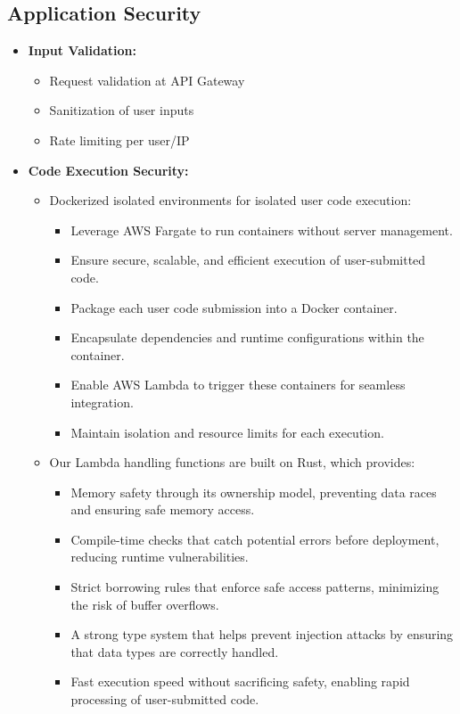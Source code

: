 \documentclass[a4paper, 11pt]{scrreprt}
\begin{document}
\subsection{Application Security}
\begin{itemize}
    \item \textbf{Input Validation:}
    \begin{itemize}
        \item Request validation at API Gateway
        \item Sanitization of user inputs
        \item Rate limiting per user/IP
    \end{itemize}
    
    \item \textbf{Code Execution Security:}
    \begin{itemize}
        \item Dockerized isolated environments for isolated user code execution:
        \begin{itemize}
            \item Leverage AWS Fargate to run containers without server management.
            \item Ensure secure, scalable, and efficient execution of user-submitted code.
            \item Package each user code submission into a Docker container.
            \item Encapsulate dependencies and runtime configurations within the container.
            \item Enable AWS Lambda to trigger these containers for seamless integration.
            \item Maintain isolation and resource limits for each execution.
        \end{itemize}
        \item Our Lambda handling functions are built on Rust, which provides:
        \begin{itemize}
            \item Memory safety through its ownership model, preventing data races and ensuring safe memory access.
            \item Compile-time checks that catch potential errors before deployment, reducing runtime vulnerabilities.
            \item Strict borrowing rules that enforce safe access patterns, minimizing the risk of buffer overflows.
            \item A strong type system that helps prevent injection attacks by ensuring that data types are correctly handled.
            \item Fast execution speed without sacrificing safety, enabling rapid processing of user-submitted code.
        \end{itemize}
    \end{itemize}
\end{itemize}
\end{document}
